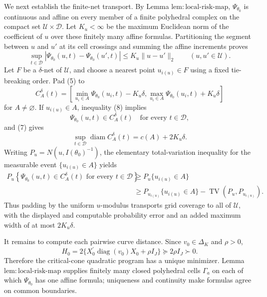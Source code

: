 We next establish the finite-net transport.  By Lemma \(\mathrm{lem:local\mbox{-}risk\mbox{-}map}\), \(\Psi_{\theta_0}\) is continuous and affine on every member of a finite polyhedral complex on the compact set \(\mathcal U\times\mathcal D\).  Let \(K_u<\infty\) be the maximum Euclidean norm of the coefficient of \(u\) over these finitely many affine formulas.  Partitioning the segment between \(u\) and \(u'\) at its cell crossings and summing the affine increments proves
\[
 \sup_{t\in\mathcal D}
 \left|\Psi_{\theta_0}(u,t)-\Psi_{\theta_0}(u',t)\right|
 \leq K_u\lVert u-u'\rVert_2
 \qquad (u,u'\in\mathcal U).
\tag{8}
\]
Let \(F\) be a \(\delta\)-net of \(\mathcal U\), and choose a nearest point \(u_{i(u)}\in F\) using a fixed tie-breaking order.  Pad (5) to
\[
 C_A^\delta(t)=
 \left[
   \min_{u_i\in A}\Psi_{\theta_0}(u_i,t)-K_u\delta,
   \max_{u_i\in A}\Psi_{\theta_0}(u_i,t)+K_u\delta
 \right]
\tag{9}
\]
for \(A\ne\varnothing\).  If \(u_{i(u)}\in A\), inequality (8) implies
\[
 \Psi_{\theta_0}(u,t)\in C_A^\delta(t)
 \quad\text{for every }t\in\mathcal D,
\tag{10}
\]
and (7) gives
\[
 \sup_{t\in\mathcal D}\operatorname{diam}C_A^\delta(t)
 =c(A)+2K_u\delta.
\tag{11}
\]
Writing \(P_u=N(u,I(\theta_0)^{-1})\), the elementary total-variation inequality for the measurable event \(\{u_{i(u)}\in A\}\) yields
\[
\begin{aligned}
 P_u\!\left\{
   \Psi_{\theta_0}(u,t)\in C_A^\delta(t)
   \text{ for every }t\in\mathcal D\right\}
 &\geq P_u\{u_{i(u)}\in A\}\\
 &\geq P_{u_{i(u)}}\{u_{i(u)}\in A\}
   -\operatorname{TV}(P_u,P_{u_{i(u)}}).
\end{aligned}
\tag{12}
\]
Thus padding by the uniform \(u\)-modulus transports grid coverage to all of \(\mathcal U\), with the displayed and computable probability error and an added maximum width of at most \(2K_u\delta\).

It remains to compute each pairwise curve distance.  Since \(v_0\in\Delta_K\) and \(\rho>0\),
\[
 H_0=2\{X_0^{\prime}\operatorname{diag}(v_0)X_0+\rho I_J\}
 \succeq 2\rho I_J\succ0.
\tag{13}
\]
Therefore the critical-cone quadratic program has a unique minimizer.  Lemma \(\mathrm{lem:local\mbox{-}risk\mbox{-}map}\) supplies finitely many closed polyhedral cells \(\Gamma_a\) on each of which \(\Psi_{\theta_0}\) has one affine formula; uniqueness and continuity make formulas agree on common boundaries.

